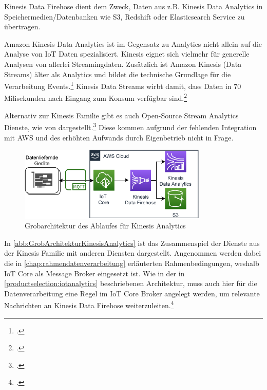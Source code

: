 Kinesis Data Firehose dient dem Zweck, Daten aus z.B. Kinesis Data Analytics in Speichermedien/Datenbanken wie \ac{S3}, Redshift oder Elasticsearch Service zu übertragen.

Amazon Kinesis Data Analytics ist im Gegensatz zu \AWSIOT{} Analytics nicht allein auf die Analyse von \ac{IoT} Daten spezialisiert. Kinesis eignet sich vielmehr für generelle Analysen von allerlei Streamingdaten. Zusätzlich ist Amazon Kinesis (Data Streams) älter als \AWSIOT{} Analytics und bildet die technische Grundlage für die Verarbeitung \AWSIOT{} Events.\footcite[Vgl.][]{Pogosova.28.05.2020} Kinesis Data Streams wirbt damit, dass Daten in 70 Milisekunden nach Eingang zum Konsum verfügbar sind.\footcite[Vgl.][]{AmazonWebServicesInc..o.J.af}

Alternativ zur Kinesis Familie gibt es auch Open-Source Stream Analytics Dienste, wie von \citeauthor{Singh.2016} dargestellt.\footcite[Vgl.][]{Singh.2016} Diese kommen aufgrund der fehlenden Integration mit \ac{AWS} und des erhöhten Aufwands durch Eigenbetrieb nicht in Frage.

\begin{figure}[H]
\centering
\includegraphics[width=0.8\textwidth]{graphics/Kinesis-Analytics-general.pdf}
\caption{Grobarchitektur des Ablaufes für Kinesis Analytics}
\label{abb:GrobArchitekturKinesisAnalytics}
\end{figure}
In \autoref{abb:GrobArchitekturKinesisAnalytics} ist das Zusammenspiel der Dienste aus der Kinesis Familie mit anderen Diensten dargestellt. Angenommen werden dabei die in \autoref{chap:rahmendatenverarbeitung} erläuterten Rahmenbedingungen, weshalb \ac{IoT} Core als Message Broker eingesetzt ist. Wie in der in \autoref{productselection:iotanalytics} beschriebenen Architektur, muss auch hier für die Datenverarbeitung eine Regel im \ac{IoT} Core Broker angelegt werden, um relevante Nachrichten an Kinesis Data Firehose weiterzuleiten.\footcite[Vgl.][]{AmazonWebServicesInc..o.J.} 

